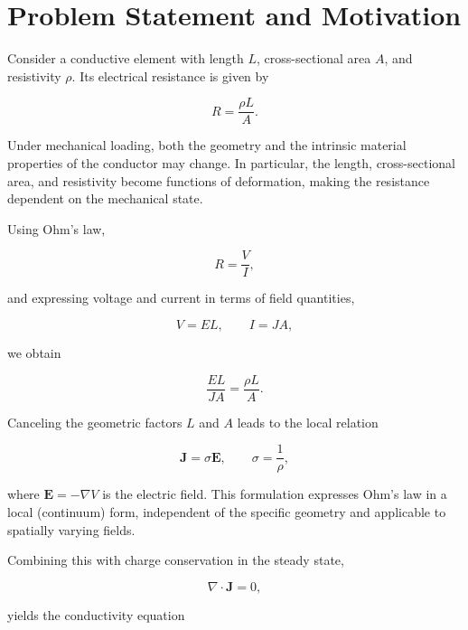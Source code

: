 \section{Problem Statement and Motivation}

Consider a conductive element with length $L$, cross-sectional area $A$, and resistivity $\rho$. 
Its electrical resistance is given by

\begin{equation}
    R = \frac{\rho L}{A}.
\end{equation}

Under mechanical loading, both the geometry and the intrinsic material properties of the conductor may change. 
In particular, the length, cross-sectional area, and resistivity become functions of deformation, 
making the resistance dependent on the mechanical state.

Using Ohm's law,

\begin{equation}
    R = \frac{V}{I},
\end{equation}

and expressing voltage and current in terms of field quantities,

\begin{equation}
    V = EL, \qquad I = JA,
\end{equation}

we obtain

\begin{equation}
    \frac{EL}{JA} = \frac{\rho L}{A}.
\end{equation}

Canceling the geometric factors $L$ and $A$ leads to the local relation

\begin{equation}
    \mathbf{J} = \sigma \mathbf{E}, \qquad \sigma = \frac{1}{\rho},
\end{equation}

where $\mathbf{E} = -\nabla V$ is the electric field. 
This formulation expresses Ohm’s law in a local (continuum) form, independent of the specific geometry 
and applicable to spatially varying fields.

Combining this with charge conservation in the steady state,

\begin{equation}
    \nabla \cdot \mathbf{J} = 0,
\end{equation}

yields the conductivity equation

